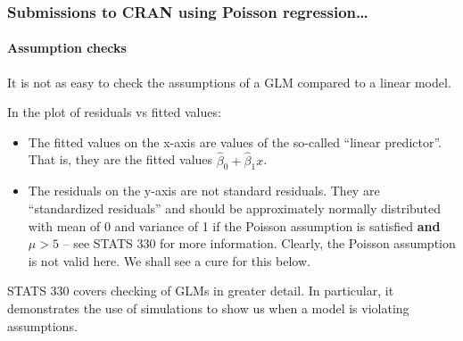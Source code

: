 \documentclass{beamer}\usepackage[]{graphicx}\usepackage[]{xcolor}
\begin{document}
\begin{frame}[fragile]
\frametitle{Submissions to CRAN using Poisson regression\ldots}
\framesubtitle{Assumption checks}

It is not as easy to check the assumptions of a GLM compared to a linear model.
\medskip

In the plot of residuals vs fitted values:

\begin{itemize}
  \item The fitted values on the x-axis are values of the so-called ``linear predictor''. That is, they are the fitted values $\hat{\beta}_0+\hat{\beta}_1 x$.
  \item The residuals on the y-axis are not standard residuals. They are ``standardized residuals'' and should be approximately normally distributed with mean of 0 and variance of 1 if the Poisson assumption is satisfied {\bf and} $\mu>5$  --  see STATS 330 for more information. Clearly, the Poisson assumption is not valid here. We shall see a cure for this below.
\end{itemize}  
\medskip

STATS 330 covers checking of GLMs in greater detail. In particular, it demonstrates the use of simulations to show us when a model is violating assumptions.

\end{frame}
\end{document}
